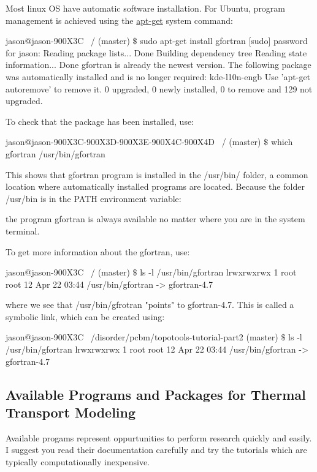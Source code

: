 Most linux OS have automatic software installation. For Ubuntu, program  
management is achieved using the 
\href{https://help.ubuntu.com/community/AptGet/Howto}{apt-get} 
system command:

jason@jason-900X3C ~/ (master) $\$$ sudo apt-get install gfortran
[sudo] password for jason: 
Reading package lists... Done
Building dependency tree       
Reading state information... Done
gfortran is already the newest version.
The following package was automatically installed and is no longer required:
  kde-l10n-engb
Use 'apt-get autoremove' to remove it.
0 upgraded, 0 newly installed, 0 to remove and 129 not upgraded.

To check that the package has been installed, use:

jason@jason-900X3C-900X3D-900X3E-900X4C-900X4D ~/ (master) $\$$ which gfortran
/usr/bin/gfortran

This shows that gfortran program is installed in the /usr/bin/ folder, 
a common location where automatically installed programs are located. 
Because the 
folder /usr/bin is in the PATH environment variable:


the program gfortran is always available no matter where you are in 
the system terminal. 

To get more information about the gfortran, use:

jason@jason-900X3C ~/ (master) $\$$ ls -l /usr/bin/gfortran
lrwxrwxrwx 1 root root 12 Apr 22 03:44 /usr/bin/gfortran -> gfortran-4.7

where we see that /usr/bin/gfrotran "points" to gfortran-4.7. 
This is called a symbolic link, which can be created using:

jason@jason-900X3C ~/disorder/pcbm/topotools-tutorial-part2 (master) $\$$ ls -l /usr/bin/gfortran
lrwxrwxrwx 1 root root 12 Apr 22 03:44 /usr/bin/gfortran -> gfortran-4.7

\subsection{\label{A:Comp_Env:Avail}Available Programs and Packages for 
Thermal Transport Modeling}

Available progams represent oppurtunities to perform research quickly and 
easily. I suggest you read their documentation carefully and try the 
tutorials which are typically computationally inexpensive. 

